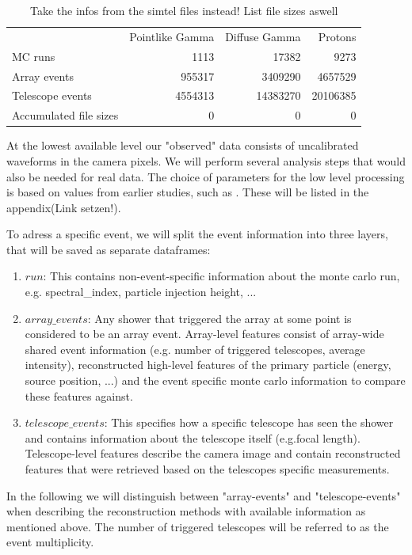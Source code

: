 \begin{table}
    \begin{center}
        \begin{tabular}{l r r r}
            \hline
            & Pointlike Gamma & Diffuse Gamma & Protons \\
            MC runs & \num{1113} & \num{17382} &  \num{9273} \\ 
            Array events & \num{955317} & \num{3409290} & \num{4657529} \\
            Telescope events & \num{4554313} & \num{14383270} & \num{20106385} \\
            Accumulated file sizes & 0 & 0 & 0 \\
        \end{tabular}
    \end{center}
    \caption{Take the infos from the simtel files instead! List file sizes aswell}
    \label{tab:mc_infos}
\end{table}

At the lowest available level our "observed" data consists of uncalibrated waveforms 
in the camera pixels.
We will perform several analysis steps that would also be needed for real data.
The choice of parameters for the low level processing 
is based on values from earlier studies, such as \cite{kai_diss}.
These will be listed in the appendix(Link setzen!).

To adress a specific event, we will split the event information into
three layers, that will be saved as separate dataframes:
\begin{enumerate}
    \item{$run$: This contains non-event-specific information about the monte carlo run, e.g.
    spectral\_index, particle injection height, ...}
    \item{$array\_events$: Any shower that triggered the array at some point 
    is considered to be an array event.
    Array-level features consist of array-wide shared event information 
    (e.g. number of triggered telescopes, average intensity),
    reconstructed high-level features of the primary particle (energy, source position, ...) and the 
    event specific monte carlo information to compare these features against.}
    \item{$telescope\_events$: This specifies how a specific telescope has seen the shower and
    contains information about the telescope itself (e.g.focal length). Telescope-level features 
    describe the camera image and contain reconstructed features that were retrieved based on 
    the telescopes specific measurements.}
\end{enumerate}
In the following we will 
distinguish between "array-events" and "telescope-events" when describing the reconstruction methods
with available information as mentioned above.
The number of triggered telescopes will be referred to as the event multiplicity.

